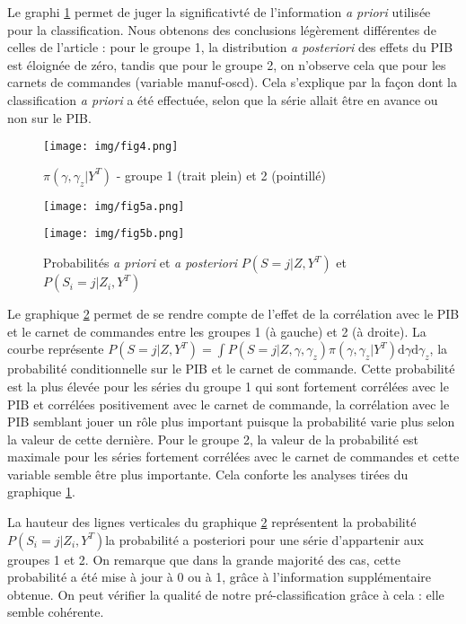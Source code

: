 \documentclass[10pt,french,french]{article}
\begin{document}
Le graphi \ref{pi_gamma} permet de juger la significativté de l'information \emph{a priori} utilisée pour la classification. Nous obtenons des conclusions légèrement différentes de celles de l'article : pour le groupe 1, la distribution \emph{a posteriori} des effets du PIB est éloignée de zéro, tandis que pour le groupe 2, on n'observe cela que pour les carnets de commandes (variable manuf-oscd). Cela s'explique par la façon dont la classification \emph{a priori} a été effectuée, selon que la série allait être en avance ou non sur le PIB.

\begin{figure}
\centering
\texttt{[image: img/fig4.png]}
\caption{$\pi(\gamma,\gamma_z|Y^T)$ - groupe 1 (trait plein) et 2 (pointillé)}
\label{pi_gamma}
\end{figure}

\begin{figure}
\begin{minipage}{.5\textwidth}
\texttt{[image: img/fig5a.png]}
\end{minipage}
\hfill
\begin{minipage}{.5\textwidth}
\texttt{[image: img/fig5b.png]}
\end{minipage}
\caption{Probabilités \textit{a priori} et \textit{a posteriori} $P(S = j|Z,Y^T)$ et $P(S_i = j|Z_i,Y^T)$}
\label{graph3d}
\end{figure}

Le graphique \ref{graph3d} permet de se rendre compte de l'effet de la corrélation avec le PIB et le carnet de commandes entre les groupes 1 (à gauche) et 2 (à droite). La courbe représente \(P(S = j|Z,Y^T) = \int P(S=j|Z,\gamma,\gamma_z)\pi(\gamma,\gamma_z|Y^T)\mathrm{d}\gamma\mathrm{d}\gamma_z\), la probabilité conditionnelle sur le PIB et le carnet de commande. Cette probabilité est la plus élevée pour les séries du groupe 1 qui sont fortement corrélées avec le PIB et corrélées positivement avec le carnet de commande, la corrélation avec le PIB semblant jouer un rôle plus important puisque la probabilité varie plus selon la valeur de cette dernière. Pour le groupe 2, la valeur de la probabilité est maximale pour les séries fortement corrélées avec le carnet de commandes et cette variable semble être plus importante. Cela conforte les analyses tirées du graphique \ref{pi_gamma}.

La hauteur des lignes verticales du graphique \ref{graph3d} représentent la probabilité \(P(S_i = j|Z_i,Y^T)\)la probabilité a posteriori pour une série d'appartenir aux groupes 1 et 2. On remarque que dans la grande majorité des cas, cette probabilité a été mise à jour à 0 ou à 1, grâce à l'information supplémentaire obtenue. On peut vérifier la qualité de notre pré-classification grâce à cela : elle semble cohérente.
\end{document}
